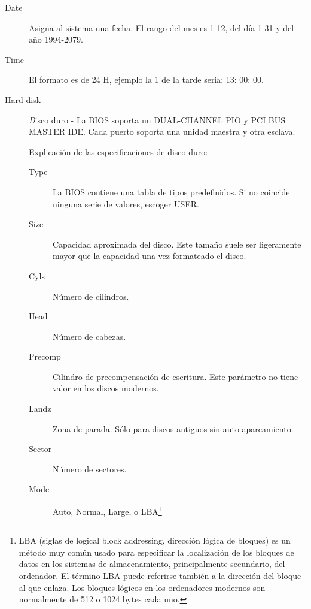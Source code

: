 \documentclass[12pt,oneside,a4paper]{article}
\begin{document}
			\begin{description}
				\item[Date] Asigna al sistema una fecha. El rango del mes es 1-12, del día 1-31 y del año 1994-2079.
				\item[Time] El formato es de 24 H, ejemplo la 1 de la tarde seria: 13: 00: 00.
				\item[Hard disk] {\emph Disco duro} - La BIOS soporta un
					DUAL-CHANNEL PIO y PCI BUS MASTER IDE. Cada puerto soporta
					una unidad maestra y otra esclava.

					{\large Explicación de las especificaciones de disco duro:}
                
					\begin{description}
						\item[Type] La BIOS contiene una tabla de tipos
							predefinidos. Si no coincide ninguna serie de
							valores, escoger USER.
						\item[Size] Capacidad aproximada del disco. Este tamaño
							suele ser ligeramente mayor que la capacidad una
							vez formateado el disco.
						\item[Cyls] Número de cilindros.
						\item[Head] Número de cabezas.
						\item[Precomp] Cilindro de precompensación de
							escritura. Este parámetro no tiene valor en los
							discos modernos.
					    \item[Landz] Zona de parada. Sólo para discos antiguos sin auto-aparcamiento.
					    \item[Sector] Número de sectores.
						\item[Mode] Auto, Normal, Large, o LBA\footnote{LBA
							(siglas de logical block addressing, dirección
							lógica de bloques) es un método muy común usado
							para especificar la localización de los bloques de
							datos en los sistemas de almacenamiento,
							principalmente secundario, del ordenador. El
							término LBA puede referirse también a la dirección
							del bloque al que enlaza.  Los bloques lógicos en
							los ordenadores modernos son normalmente de 512 o
							1024 bytes cada uno.}


\end{description}
\end{description}
\end{document}
